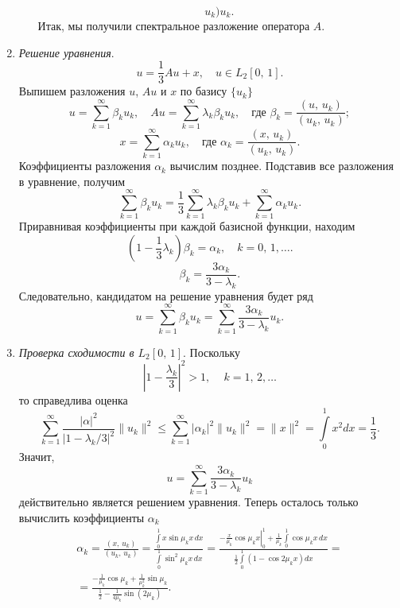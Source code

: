 \documentclass[a4paper]{article}
\begin{document}
\begin{sol}
\begin{enumerate}
\begin{enumerate}
\[{	u_k)}u_k
.\] 
Итак, мы получили спектральное разложение оператора $A$.
\end{enumerate}
\item \emph{Решение уравнения}.
	\[
		u=\frac{1}{3}Au+x,\quad u \in L_2[0,\,1]
	.\] 
Выпишем разложения $u$, $Au$ и $x$ по базису $\{u_k\} $ 
\[
u=\sum_{k=1}^{\infty} \beta_k u_k,\quad
Au= \sum_{k=1}^{\infty} \lambda_k \beta_k u_k,\quad
\text{где } \beta_k=  \frac{(u,\,u_k)}{(u_k,\,u_k)};
\]
\[
x=\sum_{k=1}^{\infty} \alpha_k u_k,\quad
\text{где }\alpha_k= \frac{(x,\,u_k)}{(u_k,\,u_k)}
.\] 
Коэффициенты разложения $\alpha_k$ вычислим позднее. Подставив
все разложения в уравнение, получим
\[
\sum_{k=1}^{\infty} \beta_k u_k=\frac{1}{3} \sum_{k=1}^{\infty} \lambda_k
\beta_k u_k+ \sum_{k=1}^{\infty} \alpha_k u_k
.\] 
Приравнивая коэффициенты при каждой базисной функции, находим
\[
	\left( 1-\frac{1}{3}\lambda_k \right) \beta_k=\alpha_k,
	\quad k=0,\,1,\ldots
.\] 
\[
\beta_k= \frac{3\alpha_k}{3-\lambda_k}
.\] 
Следовательно, кандидатом на решение уравнения будет ряд
\[
u =\sum_{k=1}^{\infty} \beta_k u_k=\sum_{k=1}^{\infty}
\frac{3\alpha_k}{3-\lambda_k}u_k
.\] 
\item \emph{Проверка сходимости в $L_2[0,\,1]$}.
Поскольку
\[
\left| 1- \frac{\lambda_k}{3} \right| ^2>1,\,\quad k=1,\,2,\ldots
\] 
то справедлива оценка
\[
\sum_{k=1}^{\infty} \frac{|\alpha|^2}{|1- \lambda_k /3|^2}\| u_k\|^2\le  \sum_{k=1}^{\infty} |\alpha_k|^2\| u_k\|^2=\| x\|^2=
\int\limits_{0}^{1} x^2 dx=\frac{1}{3} 
.\] 
Значит,
\[
u= \sum_{k=1}^{\infty} \frac{3\alpha_k}{3-\lambda_k}u_k
\]
действительно является решением уравнения. Теперь осталось
только вычислить коэффициенты $\alpha_k$ 
\begin{multline*}
	\alpha_k= \frac{(x,\,u_k)}{(u_k,\,u_k)}
	=\frac{\int\limits_{0}^{1} x \sin \mu_k x \,dx}{\int\limits_{0}^{1} \sin^2 \mu_k x\, dx }=\frac{
	\left. -\frac{x}{\mu_k}\cos\mu_k x \right|_0^1+
	\frac{1}{\mu_k}\int\limits_{0}^{1} \cos\mu_k x\, dx }{
\frac{1}{2} \int\limits_{0}^{1} (1-\cos 2\mu_k x)dx }=\\=
\frac{-\frac{1}{\mu_k}\cos \mu_k +\frac{1}{\mu_k^2}\sin\mu_k}{
\frac{1}{2}-\frac{1}{4\mu_k}\sin(2\mu_k)}
.\end{multline*} 
\end{enumerate}
\end{sol}
\end{document}
